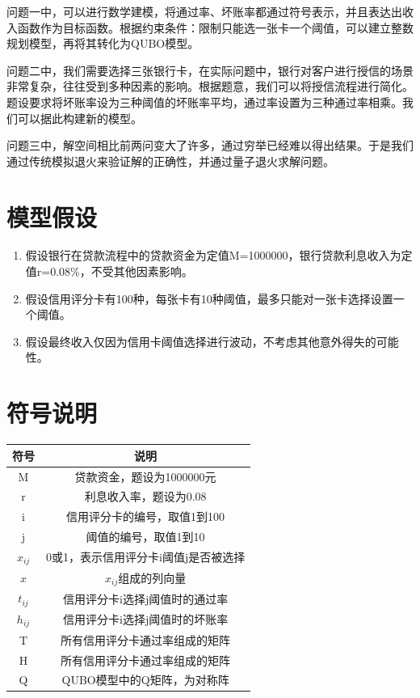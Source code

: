 \documentclass{MathorCupmodeling}
\begin{document}
  问题一中，可以进行数学建模，将通过率、坏账率都通过符号表示，并且表达出收入函数作为目标函数。根据约束条件：限制只能选一张卡一个阈值，可以建立整数规划模型，再将其转化为QUBO模型。

    问题二中，我们需要选择三张银行卡，在实际问题中，银行对客户进行授信的场景非常复杂，往往受到多种因素的影响。根据题意，我们可以将授信流程进行简化。题设要求将坏账率设为三种阈值的坏账率平均，通过率设置为三种通过率相乘。我们可以据此构建新的模型。

    问题三中，解空间相比前两问变大了许多，通过穷举已经难以得出结果。于是我们通过传统模拟退火来验证解的正确性，并通过量子退火求解问题。
 \section{模型假设}
 \begin{enumerate}
      \item 假设银行在贷款流程中的贷款资金为定值M=1000000，银行贷款利息收入为定值r=0.08\%，不受其他因素影响。
 
     \item 假设信用评分卡有100种，每张卡有10种阈值，最多只能对一张卡选择设置一个阈值。

     \item 假设最终收入仅因为信用卡阈值选择进行波动，不考虑其他意外得失的可能性。
\end{enumerate}
 \section{符号说明}
 \begin{center}
 \begin{tabular}{cc}
   \toprule
   符号 & 说明  \\
   \midrule
   M & 贷款资金，题设为1000000元  \\
   r & 利息收入率，题设为0.08  \\
   i & 信用评分卡的编号，取值1到100\\
   j & 阈值的编号，取值1到10\\
   $x_{ij}$ & 0或1，表示信用评分卡i阈值j是否被选择\\
   $x$ & $x_{ij}$组成的列向量\\
   $t_{ij}$ & 信用评分卡i选择j阈值时的通过率 \\
   $h_{ij}$ & 信用评分卡i选择j阈值时的坏账率 \\
   T & 所有信用评分卡通过率组成的矩阵\\
   H & 所有信用评分卡通过率组成的矩阵\\
   Q & QUBO模型中的Q矩阵，为对称阵\\
   \bottomrule
\end{tabular}
\end{center}
\end{document}
